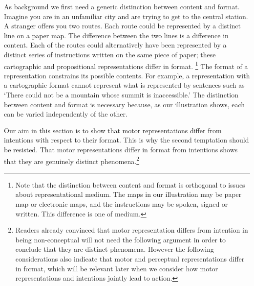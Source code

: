 \documentclass[12pt,\papersize]{extarticle}
\begin{document}
As background we first need a generic distinction between content and format. Imagine you are in an unfamiliar city and are trying to get to the central station. 
A stranger offers you two routes. 
Each route could be represented by a distinct line on a paper map. 
The difference between the two lines is a difference in content. Each of the routes could alternatively have been represented by a distinct series of instructions written on the same piece of paper; these cartographic and propositional representations differ in format.%
\footnote{Note that the distinction between content and format is orthogonal to issues about representational medium. 
The maps in our illustration may be paper map or electronic maps, and the instructions may be spoken, signed or written. This difference is one of medium.
} 
The format of a representation constrains its possible contents. For example, a representation with a cartographic format cannot represent what is represented by sentences such as `There could not be a mountain whose summit is inaccessible.'  The distinction between content and format is necessary because, as our illustration shows, each can be varied independently of the other.

Our aim in this section is to show that motor representations differ from intentions with respect to their format. This is why the second temptation should be resisted. That motor representations differ in format from intentions shows that they are genuinely distinct phenomena.\footnote{ Readers already convinced that motor representation differs from intention in being non-conceptual will not need the following argument in order to conclude that they are distinct phenomena. However the following considerations also indicate that motor and perceptual representations differ in format, which will be relevant later when we consider how motor representations and intentions jointly lead to action.}
\end{document}
